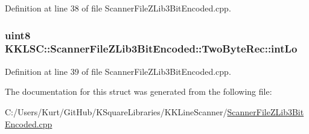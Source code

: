 Definition at line 38 of file Scanner\+File\+Z\+Lib3\+Bit\+Encoded.\+cpp.

\subsubsection[{\texorpdfstring{int\+Lo}{intLo}}]{\setlength{\rightskip}{0pt plus 5cm}uint8 K\+K\+L\+S\+C\+::\+Scanner\+File\+Z\+Lib3\+Bit\+Encoded\+::\+Two\+Byte\+Rec\+::int\+Lo}\hypertarget{struct_scanner_file_z_lib3_bit_encoded_1_1_two_byte_rec_af747516492678adfa78692c53c91487c}{}\label{struct_scanner_file_z_lib3_bit_encoded_1_1_two_byte_rec_af747516492678adfa78692c53c91487c}


Definition at line 39 of file Scanner\+File\+Z\+Lib3\+Bit\+Encoded.\+cpp.



The documentation for this struct was generated from the following file\+:\begin{DoxyCompactItemize}
\item 
C\+:/\+Users/\+Kurt/\+Git\+Hub/\+K\+Square\+Libraries/\+K\+K\+Line\+Scanner/\hyperlink{_scanner_file_z_lib3_bit_encoded_8cpp}{Scanner\+File\+Z\+Lib3\+Bit\+Encoded.\+cpp}\end{DoxyCompactItemize}
